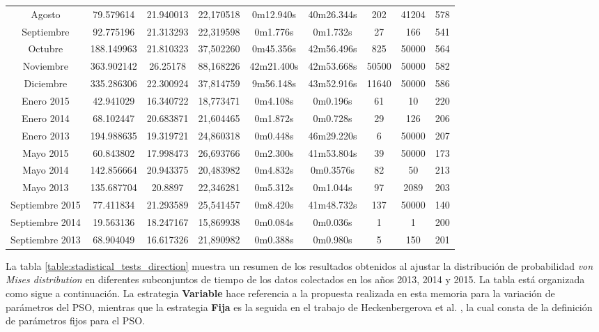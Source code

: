 \begin{table}[ht!]
{\begin{tabular}{|c|c|c|c|c|c|c|c|c|}
        Agosto          & 79.579614     & 21.940013     & 22,170518     & 0m12.940s     & 40m26.344s    & 202   & 41204 & 578 \\
        Septiembre      & 92.775196     & 21.313293     & 22,319598     & 0m1.776s      & 0m1.732s      & 27    & 166   & 541 \\
        Octubre         & 188.149963    & 21.810323     & 37,502260     & 0m45.356s     & 42m56.496s    & 825   & 50000 & 564 \\
        Noviembre       & 363.902142    & 26.25178      & 88,168226     & 42m21.400s    & 42m53.668s    & 50500 & 50000 & 582 \\
        Diciembre       & 335.286306    & 22.300924     & 37,814759     & 9m56.148s     & 43m52.916s    & 11640 & 50000 & 586 \\
        \hline 
        Enero 2015      & 42.941029     & 16.340722     & 18,773471     & 0m4.108s      & 0m0.196s      & 61    & 10    & 220 \\
        Enero 2014      & 68.102447     & 20.683871     & 21,604465     & 0m1.872s      & 0m0.728s      & 29    & 126   & 206 \\
        Enero 2013      & 194.988635    & 19.319721     & 24,860318     & 0m0.448s      & 46m29.220s    & 6     & 50000 & 207 \\
        Mayo 2015       & 60.843802     & 17.998473     & 26,693766     & 0m2.300s      & 41m53.804s    & 39    & 50000 & 173 \\
        Mayo 2014       & 142.856664    & 20.943375     & 20,483982     & 0m4.832s      & 0m0.3576s     & 82    & 50    & 213 \\
        Mayo 2013       & 135.687704    & 20.8897       & 22,346281     & 0m5.312s      & 0m1.044s      & 97    & 2089  & 203 \\
        Septiembre 2015 & 77.411834     & 21.293589     & 25,541457     & 0m8.420s      & 41m48.732s    & 137   & 50000 & 140 \\
        Septiembre 2014 & 19.563136     & 18.247167     & 15,869938     & 0m0.084s      & 0m0.036s      & 1     & 1     & 200 \\
        Septiembre 2013 & 68.904049     & 16.617326     & 21,890982     & 0m0.388s      & 0m0.980s      & 5     & 150   & 201 \\
        \hline  
    \end{tabular}
    }   
\end{table}
La tabla \ref{table:stadistical_tests_direction} muestra un resumen de los resultados obtenidos al ajustar la distribución de probabilidad \emph{von Mises distribution} en diferentes subconjuntos de tiempo de los datos colectados en los años 2013, 2014 y 2015. La tabla está organizada como sigue a continuación. La estrategia \textbf{Variable} hace referencia a la propuesta realizada en esta memoria para la variación de parámetros del PSO, mientras que la estrategia \textbf{Fija} es la seguida en el trabajo de Heckenbergerova et al. \cite{Heckenbergerova15}, la cual consta de la definición de parámetros fijos para el PSO.
